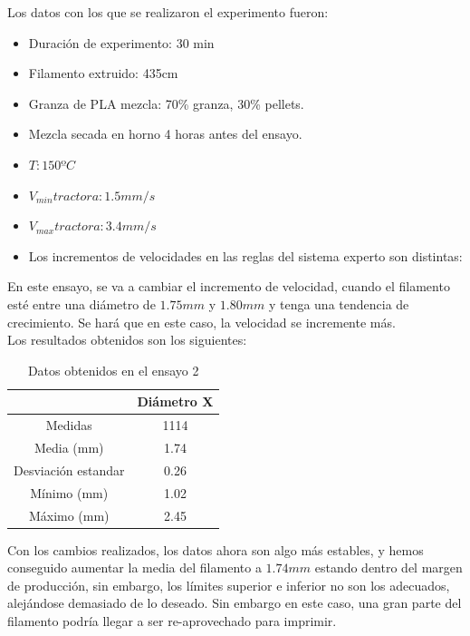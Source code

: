 Los datos con los que se realizaron el experimento fueron:

\begin{itemize}
	\item{Duración de experimento: 30 min}
	\item{Filamento extruido: 435cm}
	\item{Granza de PLA mezcla: 70\% granza, 30\% pellets.}
	\item{Mezcla secada en horno 4 horas antes del ensayo.}
	\item{$T: 150ºC$}
	\item{$V_{min} tractora: 1.5 mm/s$}
	\item{$V_{max} tractora: 3.4 mm/s$}
	\item{Los incrementos de velocidades en las reglas del sistema experto son distintas:}
\end{itemize}

En este ensayo, se va a cambiar el incremento de velocidad, cuando el filamento esté entre una diámetro de $1.75 mm$ y $1.80 mm$ y tenga una tendencia de crecimiento. Se hará que en este caso, la velocidad se incremente más.\\

Los resultados obtenidos son los siguientes:

\begin{table}[H]
	\centering
	\begin{tabular}{cc}
		                    & Diámetro X \\ \hline
		Medidas             & 1114      \\
		Media (mm)          & 1.74       \\
		Desviación estandar & 0.26       \\
		Mínimo (mm)         & 1.02       \\
		Máximo (mm)         & 2.45      
	\end{tabular}
	\caption{Datos obtenidos en el ensayo 2}
	\label{tab:resl_ens2}
\end{table}

Con los cambios realizados, los datos ahora son algo más estables, y hemos conseguido aumentar la media del filamento a $1.74 mm$ estando dentro del margen de producción, sin embargo, los límites superior e inferior no son los adecuados, alejándose demasiado de lo deseado. Sin embargo en este caso, una gran parte del filamento podría llegar a ser re-aprovechado para imprimir.

